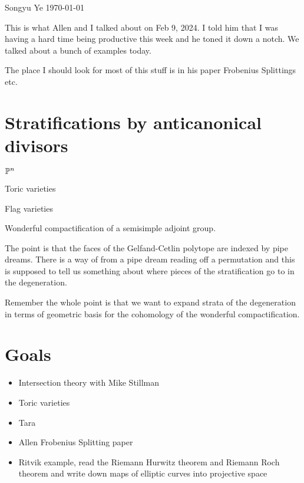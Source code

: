 \documentclass[12pt]{article}
\begin{document}
Songyu Ye 
\today

\hfill

This is what Allen and I talked about on Feb 9, 2024.
I told him that I was having a hard time being productive this week and 
he toned it down a notch. We talked about a bunch of examples today.

The place I should look for most of this stuff is in his paper Frobenius Splittings etc.

\section{Stratifications by anticanonical divisors}
\begin{example}
    $\P^n$
\end{example}
\begin{example}
    Toric varieties
\end{example}
\begin{example}
    Flag varieties
\end{example}

\begin{example}
    Wonderful compactification of a semisimple adjoint group.
\end{example}

The point is that the faces of the Gelfand-Cetlin polytope are indexed by pipe dreams. 
There is a way of from a pipe dream reading off a permutation and this is supposed to tell us 
something about where pieces of the stratification go to in the degeneration.

\hfill

Remember the whole point is that we want to expand strata of the degeneration in terms of
geometric basis for the cohomology of the wonderful compactification.

\section{Goals}
\begin{itemize}
    \item Intersection theory with Mike Stillman
    \item Toric varieties
    \item Tara 
    \item Allen Frobenius Splitting paper
    \item Ritvik example, read the Riemann Hurwitz theorem and Riemann Roch theorem and 
    write down maps of elliptic curves into projective space
\end{itemize}
\end{document}
